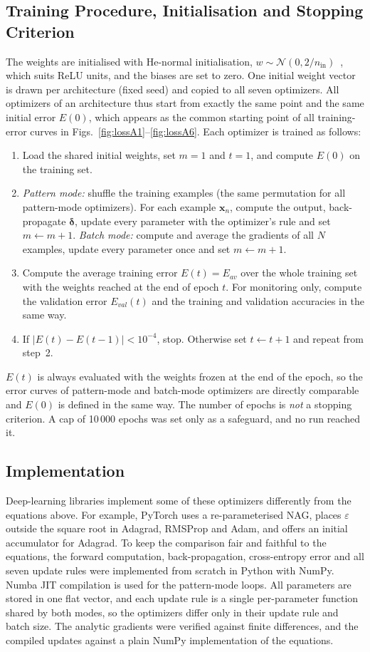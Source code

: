 \documentclass[runningheads]{llncs}
\begin{document}
\subsection{Training Procedure, Initialisation and Stopping Criterion}
The weights are initialised with He-normal initialisation, $w\sim\mathcal{N}(0,2/n_\text{in})$~\cite{he2015},
which suits ReLU units, and the biases are set to zero. One initial weight vector is drawn per
architecture (fixed seed) and copied to all seven optimizers. All optimizers of an architecture thus
start from exactly the same point and the same initial error $E(0)$, which appears as the common
starting point of all training-error curves in Figs.~\ref{fig:lossA1}--\ref{fig:lossA6}. Each optimizer is trained as follows:
\begin{enumerate}
\item Load the shared initial weights, set $m=1$ and $t=1$, and compute $E(0)$ on the training set.
\item \emph{Pattern mode:} shuffle the training examples (the same permutation for all pattern-mode
optimizers). For each example $\mathbf{x}_n$, compute the output, back-propagate
$\boldsymbol{\delta}$, update every parameter with the optimizer's rule and set $m\leftarrow m+1$.
\emph{Batch mode:} compute and average the gradients of all $N$ examples, update every parameter
once and set $m\leftarrow m+1$.
\item Compute the average training error $E(t)=E_{av}$ over the whole training set with the weights
reached at the end of epoch $t$. For monitoring only, compute the validation error $E_{val}(t)$ and
the training and validation accuracies in the same way.
\item If $|E(t)-E(t-1)|<10^{-4}$, stop. Otherwise set $t\leftarrow t+1$ and repeat from step~2.
\end{enumerate}
$E(t)$ is always evaluated with the weights frozen at the end of the epoch, so the error curves of
pattern-mode and batch-mode optimizers are directly comparable and $E(0)$ is defined in the same way.
The number of epochs is \emph{not} a stopping criterion. A cap of 10\,000 epochs was set only as a
safeguard, and no run reached it.

\subsection{Implementation}
Deep-learning libraries implement some of these optimizers differently from the equations above.
For example, PyTorch uses a re-parameterised NAG, places $\varepsilon$ outside the square root in
Adagrad, RMSProp and Adam, and offers an initial accumulator for Adagrad. To keep the comparison fair
and faithful to the equations, the forward computation, back-propagation, cross-entropy error and
all seven update rules were implemented from scratch in Python with NumPy. Numba JIT compilation is
used for the pattern-mode loops. All parameters are stored in one flat vector, and each update rule
is a single per-parameter function shared by both modes, so the optimizers differ only in their
update rule and batch size. The analytic gradients were verified against finite differences, and
the compiled updates against a plain NumPy implementation of the equations.
\end{document}
